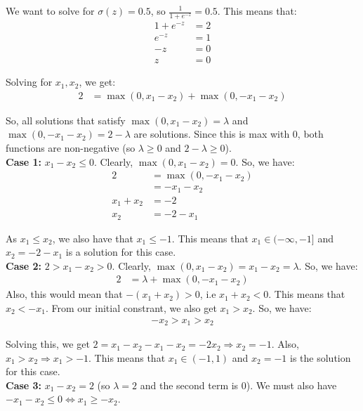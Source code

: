 \documentclass[a4paper]{article}
\begin{document}
We want to solve for $\sigma(z) = 0.5$, so $\frac{1}{1 + e^{-z}} = 0.5$. This means that:
\begin{align*}
    1 + e^{-z} &= 2\\
    e^{-z} &= 1\\
    -z &= 0\\
    z &= 0
\end{align*}

Solving for $x_1, x_2$, we get:
\begin{align*}
    2 &= \max(0, x_1 - x_2) + \max(0, -x_1 - x_2)
\end{align*}

So, all solutions that satisfy $\max(0, x_1 - x_2) = \lambda$ and $\max(0, -x_1 - x_2) = 2 - \lambda$ are solutions. Since this is max with 0, both functions are non-negative (so $\lambda \geq 0$ and $2 - \lambda \geq 0$).\\

\textbf{Case 1:} $x_1 - x_2 \leq 0$. Clearly, $\max(0, x_1 - x_2) = 0$. So, we have:
\begin{align*}
    2 &= \max(0, -x_1 - x_2)\\
    &= -x_1 - x_2\\
    x_1 + x_2 &= -2\\
    x_2 &= -2 - x_1
\end{align*}

As $x_1 \leq x_2$, we also have that $x_1 \leq -1$. This means that $x_1 \in (-\infty, -1]$ and $x_2 = -2 - x_1$ is a solution for this case.\\

\textbf{Case 2:} $2 > x_1 - x_2 > 0$. Clearly, $\max(0, x_1 - x_2) = x_1 - x_2 = \lambda$. So, we have:
\begin{align*}
    2 &= \lambda + \max(0, -x_1 - x_2)
\end{align*}
Also, this would mean that $-(x_1 + x_2) > 0$, i.e $x_1 + x_2 < 0$. This means that $x_2 < -x_1$. From our initial constrant, we also get $x_1 > x_2$. So, we have:
\begin{align*}
    -x_2 > x_1 > x_2
\end{align*}

Solving this, we get $2 = x_1 - x_2 -x_1 - x_2 = -2x_2 \Rightarrow x_2 = -1$. Also, $x_1 > x_2 \Rightarrow x_1 > -1$. This means that $x_1 \in (-1, 1)$ and $x_2 = -1$ is the solution for this case.\\

\textbf{Case 3:} \(x_1 - x_2 = 2\) (so \(\lambda = 2\) and the second term is \(0\)).  We must also have \(-x_1 - x_2 \le 0 \iff x_1 \ge -x_2\).\\
\end{document}
